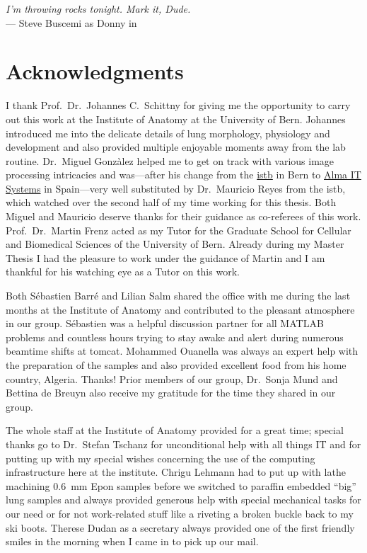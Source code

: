 \acresetall
{}
\begin{flushright}{\slshape I'm throwing rocks tonight. Mark it, Dude.} \\ \medskip
    --- Steve Buscemi as Donny in \citep{TheBigLebowski}
\end{flushright}
\vspace{52mm}

\begingroup
\let\clearpage\relax
\let\cleardoublepage\relax
\let\cleardoublepage\relax
\chapter*{Acknowledgments}
I thank Prof.\ Dr.\ Johannes C.\ Schittny for giving me the opportunity to carry out this work at the Institute of Anatomy at the University of Bern. Johannes introduced me into the delicate details of lung morphology, physiology and development and also provided multiple enjoyable moments away from the lab routine. Dr.\ Miguel Gonzàlez helped me to get on track with various image processing intricacies and was---after his  change from the \href{http://www.istb.unibe.ch/}{\ac{istb}} in Bern to \href{http://www.alma3d.com/en}{Alma IT Systems} in Spain---very well substituted by Dr.\ Mauricio Reyes from the \ac{istb}, which watched over the second half of my time working for this thesis. Both Miguel and Mauricio deserve thanks for their guidance as co-referees of this work. Prof.\ Dr.\ Martin Frenz acted as my Tutor for the Graduate School for Cellular and Biomedical Sciences of the University of Bern. Already during my Master Thesis I had the pleasure to work under the guidance of  Martin and I am thankful for his watching eye as a Tutor on this work.

Both Sébastien Barré and Lilian Salm shared the office with me during the last months at the Institute of Anatomy and contributed to the pleasant atmosphere in our group. Sébastien was a helpful discussion partner for all MATLAB problems and countless hours trying to stay awake and alert during numerous beamtime shifts at \acs{tomcat}. Mohammed Ouanella was always an expert help with the preparation of the samples and also provided excellent food from his home country, Algeria. Thanks! Prior members of our group, Dr.\ Sonja Mund and Bettina de Breuyn also receive my gratitude for the time they shared in our group.

The whole staff at the Institute of Anatomy provided for a great time; special thanks go to Dr.\ Stefan Tschanz for unconditional help with all things IT and for putting up with my special wishes concerning the use of the computing infrastructure here at the institute. Chrigu Lehmann had to put up with lathe machining \SI{0.6}{\milli\meter} Epon samples before we switched to paraffin embedded ``big'' lung samples and always provided generous help with special mechanical tasks for our need or for not work-related stuff like a riveting a broken buckle back to my ski boots. Therese Dudan as a secretary always provided one of the first friendly smiles in the morning when I came in to pick up our mail.

